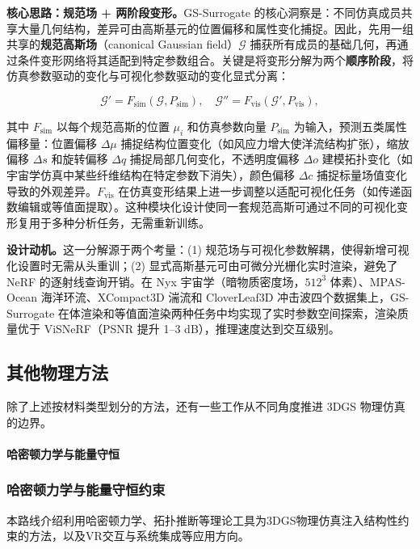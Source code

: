 \textbf{核心思路：规范场 + 两阶段变形。}GS-Surrogate 的核心洞察是：不同仿真成员共享大量几何结构，差异可由高斯基元的位置偏移和属性变化捕捉。因此，先用一组共享的\textbf{规范高斯场}（canonical Gaussian field）$\mathcal{G}$ 捕获所有成员的基础几何，再通过条件变形网络将其适配到特定参数组合。关键是将变形分解为两个\textbf{顺序阶段}，将仿真参数驱动的变化与可视化参数驱动的变化显式分离：

\begin{equation}
\mathcal{G}' = F_{\text{sim}}(\mathcal{G}, P_{\text{sim}}), \quad \mathcal{G}'' = F_{\text{vis}}(\mathcal{G}', P_{\text{vis}}),
\end{equation}

其中 $F_{\text{sim}}$ 以每个规范高斯的位置 $\mu_i$ 和仿真参数向量 $P_{\text{sim}}$ 为输入，预测五类属性偏移量：位置偏移 $\Delta\mu$ 捕捉结构位置变化（如风应力增大使洋流结构扩张），缩放偏移 $\Delta s$ 和旋转偏移 $\Delta q$ 捕捉局部几何变化，不透明度偏移 $\Delta o$ 建模拓扑变化（如宇宙学仿真中某些纤维结构在特定参数下消失），颜色偏移 $\Delta c$ 捕捉标量场值变化导致的外观差异。$F_{\text{vis}}$ 在仿真变形结果上进一步调整以适配可视化任务（如传递函数编辑或等值面提取）。这种模块化设计使同一套规范高斯可通过不同的可视化变形复用于多种分析任务，无需重新训练。

\textbf{设计动机。}这一分解源于两个考量：(1) 规范场与可视化参数解耦，使得新增可视化设置时无需从头重训；(2) 显式高斯基元可由可微分光栅化实时渲染，避免了 NeRF 的逐射线查询开销。在 Nyx 宇宙学（暗物质密度场，$512^3$ 体素）、MPAS-Ocean 海洋环流、XCompact3D 湍流和 CloverLeaf3D 冲击波四个数据集上，GS-Surrogate 在体渲染和等值面渲染两种任务中均实现了实时参数空间探索，渲染质量优于 ViSNeRF（PSNR 提升 1--3 dB），推理速度达到交互级别。

\subsection{其他物理方法}

除了上述按材料类型划分的方法，还有一些工作从不同角度推进 3DGS 物理仿真的边界。

\paragraph{哈密顿力学与能量守恒}

\subsubsection{哈密顿力学与能量守恒约束}

本路线介绍利用哈密顿力学、拓扑推断等理论工具为3DGS物理仿真注入结构性约束的方法，以及VR交互与系统集成等应用方向。

